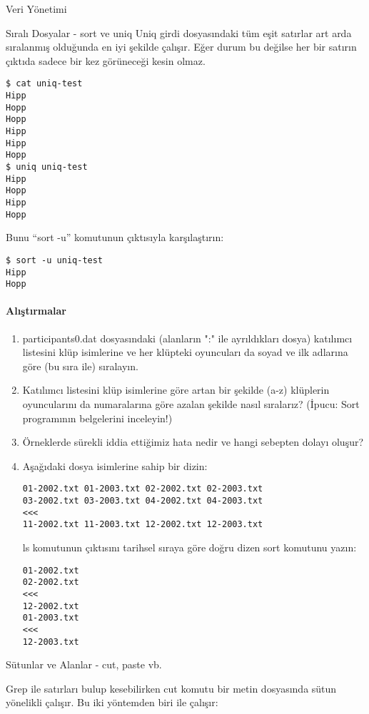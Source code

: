 \begin{section}{Veri Yönetimi}
\begin{subsection}{Sıralı Dosyalar - sort ve uniq}
Uniq girdi dosyasındaki tüm eşit satırlar art arda sıralanmış olduğunda en iyi şekilde çalışır. Eğer durum bu değilse her bir satırın çıktıda sadece bir kez görüneceği kesin olmaz.

\begin{verbatim}
$ cat uniq-test
Hipp
Hopp
Hopp
Hipp
Hipp
Hopp
$ uniq uniq-test
Hipp
Hopp
Hipp
Hopp
\end{verbatim}

Bunu “sort -u” komutunun çıktısıyla karşılaştırın:

\begin{verbatim}
$ sort -u uniq-test
Hipp
Hopp
\end{verbatim}

\paragraph{{\Huge{\PencilLeftDown}}Alıştırmalar}{
\begin{enumerate}
 \item participants0.dat dosyasındaki (alanların ":" ile ayrıldıkları dosya) katılımcı listesini klüp isimlerine ve her klüpteki oyuncuları da soyad ve ilk adlarına göre (bu sıra ile) sıralayın.
 \item Katılımcı listesini klüp isimlerine göre artan bir şekilde (a-z) klüplerin oyuncularını da numaralarına göre azalan şekilde nasıl sıralarız? (İpucu: Sort programının belgelerini inceleyin!)
 \item Örneklerde sürekli iddia ettiğimiz hata nedir ve hangi sebepten dolayı oluşur?
 \item Aşağıdaki dosya isimlerine sahip bir dizin:
 \begin{verbatim}
01-2002.txt 01-2003.txt 02-2002.txt 02-2003.txt
03-2002.txt 03-2003.txt 04-2002.txt 04-2003.txt
<<<
11-2002.txt 11-2003.txt 12-2002.txt 12-2003.txt
 \end{verbatim}
 ls komutunun çıktısını tarihsel sıraya göre doğru dizen sort komutunu yazın:
 \begin{verbatim}
01-2002.txt
02-2002.txt
<<<
12-2002.txt
01-2003.txt
<<<
12-2003.txt
 \end{verbatim}
\end{enumerate}}

\end{subsection}

\begin{subsection}{Sütunlar ve Alanlar - cut, paste vb.}

Grep ile satırları bulup kesebilirken cut komutu bir metin dosyasında sütun yönelikli çalışır. Bu iki yöntemden biri ile çalışır:


\end{subsection}
\end{section}
